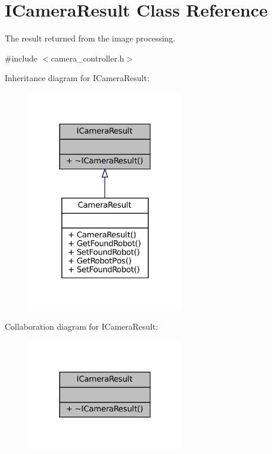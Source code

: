 \hypertarget{classICameraResult}{}\section{I\+Camera\+Result Class Reference}
\label{classICameraResult}


The result returned from the image processing.  




{\ttfamily \#include $<$camera\+\_\+controller.\+h$>$}



Inheritance diagram for I\+Camera\+Result\+:\nopagebreak
\begin{figure}[H]
\begin{center}
\leavevmode
\includegraphics[width=195pt]{classICameraResult__inherit__graph}
\end{center}
\end{figure}


Collaboration diagram for I\+Camera\+Result\+:\nopagebreak
\begin{figure}[H]
\begin{center}
\leavevmode
\includegraphics[width=195pt]{classICameraResult__coll__graph}
\end{center}
\end{figure}
